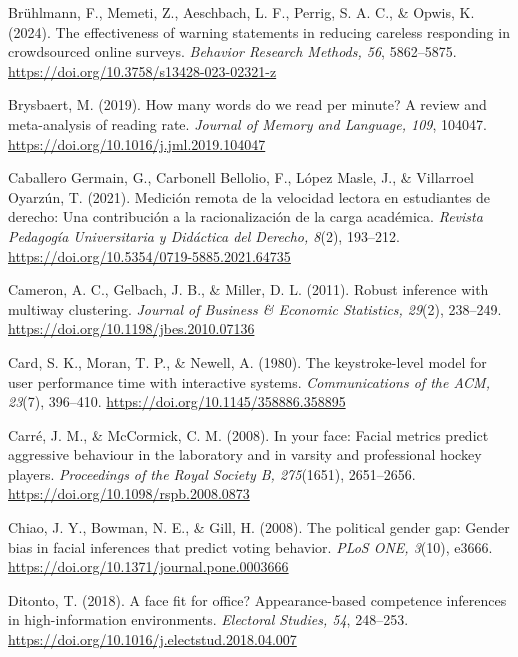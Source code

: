 \documentclass[11pt]{article}\usepackage[]{graphicx}\usepackage[]{xcolor}
\begin{document}
{\begin{list}{}{%
  \setlength{\leftmargin}{1.5em}%
  \setlength{\itemindent}{-1.5em}%
  \setlength{\itemsep}{0pt}%
  \setlength{\parsep}{0pt}%
  \setlength{\topsep}{1pt}%
}
\item Br\"uhlmann, F., Memeti, Z., Aeschbach, L. F., Perrig, S. A. C., \& Opwis, K. (2024). The effectiveness of warning statements in reducing careless responding in crowdsourced online surveys. \emph{Behavior Research Methods, 56}, 5862--5875. \url{https://doi.org/10.3758/s13428-023-02321-z}

\item Brysbaert, M. (2019). How many words do we read per minute? A review and meta-analysis of reading rate. \emph{Journal of Memory and Language, 109}, 104047. \url{https://doi.org/10.1016/j.jml.2019.104047}

\item Caballero Germain, G., Carbonell Bellolio, F., L\'opez Masle, J., \& Villarroel Oyarz\'un, T. (2021). Medici\'on remota de la velocidad lectora en estudiantes de derecho: Una contribuci\'on a la racionalizaci\'on de la carga acad\'emica. \emph{Revista Pedagog\'ia Universitaria y Did\'actica del Derecho, 8}(2), 193--212. \url{https://doi.org/10.5354/0719-5885.2021.64735}

\item Cameron, A. C., Gelbach, J. B., \& Miller, D. L. (2011). Robust inference with multiway clustering. \emph{Journal of Business \& Economic Statistics, 29}(2), 238--249. \url{https://doi.org/10.1198/jbes.2010.07136}

\item Card, S. K., Moran, T. P., \& Newell, A. (1980). The keystroke-level model for user performance time with interactive systems. \emph{Communications of the ACM, 23}(7), 396--410. \url{https://doi.org/10.1145/358886.358895}

\item Carr\'e, J. M., \& McCormick, C. M. (2008). In your face: Facial metrics predict aggressive behaviour in the laboratory and in varsity and professional hockey players. \emph{Proceedings of the Royal Society B, 275}(1651), 2651--2656. \url{https://doi.org/10.1098/rspb.2008.0873}

\item Chiao, J. Y., Bowman, N. E., \& Gill, H. (2008). The political gender gap: Gender bias in facial inferences that predict voting behavior. \emph{PLoS ONE, 3}(10), e3666. \url{https://doi.org/10.1371/journal.pone.0003666}

\item Ditonto, T. (2018). A face fit for office? Appearance-based competence inferences in high-information environments. \emph{Electoral Studies, 54}, 248--253. \url{https://doi.org/10.1016/j.electstud.2018.04.007}


\end{list}}
\end{document}
